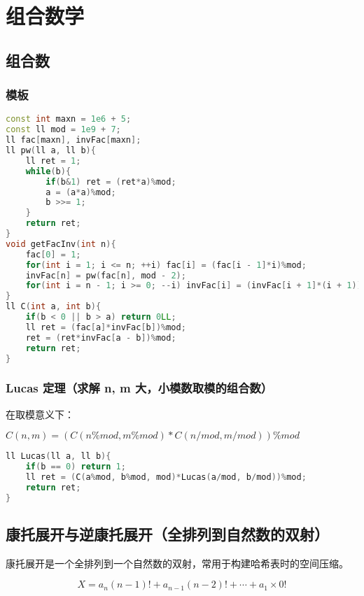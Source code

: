 

\section{组合数学}

\subsection{组合数}

\subsubsection{模板}

\begin{lstlisting}[language=C++]
const int maxn = 1e6 + 5;
const ll mod = 1e9 + 7;
ll fac[maxn], invFac[maxn];
ll pw(ll a, ll b){
    ll ret = 1;
    while(b){
        if(b&1) ret = (ret*a)%mod;
        a = (a*a)%mod;
        b >>= 1;
    }
    return ret;
}
void getFacInv(int n){
    fac[0] = 1;
    for(int i = 1; i <= n; ++i) fac[i] = (fac[i - 1]*i)%mod;
    invFac[n] = pw(fac[n], mod - 2);
    for(int i = n - 1; i >= 0; --i) invFac[i] = (invFac[i + 1]*(i + 1))%mod;
}
ll C(int a, int b){
    if(b < 0 || b > a) return 0LL;
    ll ret = (fac[a]*invFac[b])%mod;
    ret = (ret*invFac[a - b])%mod;
    return ret;
}
\end{lstlisting}

\subsubsection{Lucas 定理（求解 n, m 大，小模数取模的组合数）}

在取模意义下：

$C(n,m) = (C(n\%mod,m\%mod)*C(n/mod,m/mod))\%mod$

\begin{lstlisting}[language=C++]
ll Lucas(ll a, ll b){
    if(b == 0) return 1;
    ll ret = (C(a%mod, b%mod, mod)*Lucas(a/mod, b/mod))%mod;
    return ret;
}
\end{lstlisting}

\subsection{康托展开与逆康托展开（全排列到自然数的双射）}

康托展开是一个全排列到一个自然数的双射，常用于构建哈希表时的空间压缩。

$$X = a_n(n - 1)! + a_{n - 1}(n - 2)! + \cdots + a_1\times 0!$$

